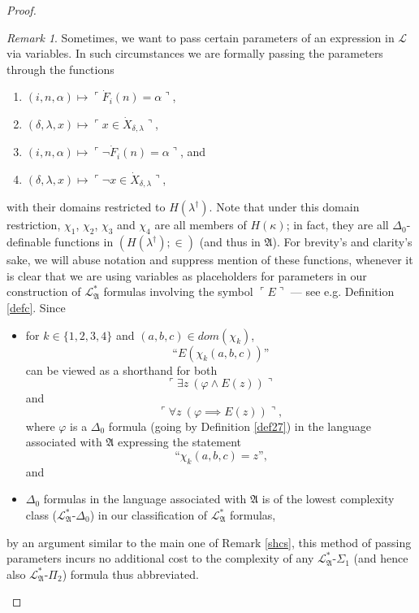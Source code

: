 \documentclass[12pt, twoside]{memoir}
\numberwithin{equation}{section}
\theoremstyle{definition}
\theoremstyle{remark}
\newtheorem{rem}[thm]{Remark}
\theoremstyle{definition}
\theoremstyle{definition}
\theoremstyle{definition}
\theoremstyle{remark}
\begin{document}
\begin{proof}
\begin{rem}\label{rempp}
Sometimes, we want to pass certain parameters of an expression in $\mathcal{L}$ via variables. In such circumstances we are formally passing the parameters through the functions
\begin{enumerate}[label=$\chi_{\arabic*} :$, leftmargin=45pt]
    \item $(i, n, \alpha) \mapsto \ulcorner \dot{F}_i (n) = \alpha \urcorner$,
    \item $(\delta, \lambda, x) \mapsto \ulcorner x \in \dot{X}_{\delta, \lambda} \urcorner$,
    \item $(i, n, \alpha) \mapsto \ulcorner \neg \dot{F}_i (n) = \alpha \urcorner$, and
    \item $(\delta, \lambda, x) \mapsto \ulcorner \neg x \in \dot{X}_{\delta, \lambda} \urcorner$,
\end{enumerate}
with their domains restricted to $H(\lambda^{\dagger})$. Note that under this domain restriction, $\chi_1$, $\chi_2$, $\chi_3$ and $\chi_4$ are all members of $H(\kappa)$; in fact, they are all $\Delta_0$-definable functions in $(H(\lambda^{\dagger}); \in)$ (and thus in $\mathfrak{A}$). For brevity's and clarity's sake, we will abuse notation and suppress mention of these functions, whenever it is clear that we are using variables as placeholders for parameters in our construction of $\mathcal{L}^{*}_{\mathfrak{A}}$ formulas involving the symbol $\ulcorner E \urcorner$ --- see e.g. Definition \ref{defc}. Since 
\begin{itemize}
    \item for $k \in \{1, 2, 3, 4\}$ and $(a, b, c) \in dom(\chi_k)$, $$\text{``} E(\chi_k(a,b,c)) \text{''}$$ can be viewed as a shorthand for both $$\ulcorner \exists z \ (\varphi \wedge E(z)) \urcorner$$ and $$\ulcorner \forall z \ (\varphi \implies E(z)) \urcorner,$$ where $\varphi$ is a $\Delta_0$ formula (going by Definition \ref{def27}) in the language associated with $\mathfrak{A}$ expressing the statement $$\text{``} \chi_k(a, b, c) = z \text{'',}$$ and
    \item $\Delta_0$ formulas in the language associated with $\mathfrak{A}$ is of the lowest complexity class ($\mathcal{L}^{*}_{\mathfrak{A}}$-$\Delta_0$) in our classification of $\mathcal{L}^{*}_{\mathfrak{A}}$ formulas,
\end{itemize} 
by an argument similar to the main one of Remark \ref{shcs}, this method of passing parameters incurs no additional cost to the complexity of any $\mathcal{L}^{*}_{\mathfrak{A}}$-$\Sigma_1$ (and hence also $\mathcal{L}^{*}_{\mathfrak{A}}$-$\Pi_2$) formula thus abbreviated.
\end{rem}


\end{proof}
\end{document}
